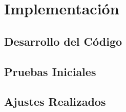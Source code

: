 \chapter{Implementación}\label{ch:implementacion}

\section{Desarrollo del Código}\label{sec:desarrollo_del_codigo}

\section{Pruebas Iniciales}\label{sec:pruebas_iniciales}

\section{Ajustes Realizados}\label{sec:ajustes_realizados}
